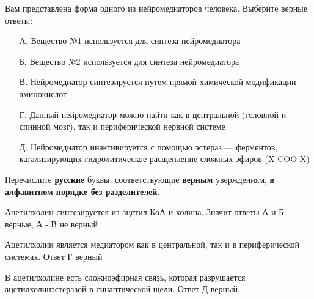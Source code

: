 

Вам представлена форма одного из нейромедиаторов человека. Выберите верные ответы:
\begin{enumerate}
    \item[А.] Вещество №1 используется для синтеза нейромедиатора
    \item[Б.] Вещество №2 используется для синтеза нейромедиатора
    \item[В.] Нейромедиатор синтезируется путем прямой химической модификации аминокислот
    \item[Г.] Данный нейромедиатор можно найти как в центральной (головной и спинной мозг), так и периферической нервной системе
    \item[Д.] Нейромедиатор инактивируется с помощью эстераз — ферментов, катализирующих гидролитическое расщепление сложных эфиров (X-COO-X)
\end{enumerate} 

Перечислите \textbf{русские} буквы, соответствующие \textbf{верным} уверждениям, \textbf{в алфавитном порядке без разделителей}.

\solutionSection

Ацетилхолин синтезируется из ацетил-КоА и холина. Значит ответы А и Б верные, А - В не верный

Ацетилхолин является медиатором как в центральной, так и в периферической системах. Ответ Г верный

В ацетилхолине есть сложноэфирная связь, которая разрушается ацетилхолинэстеразой в синаптической щели. Ответ Д верный.

